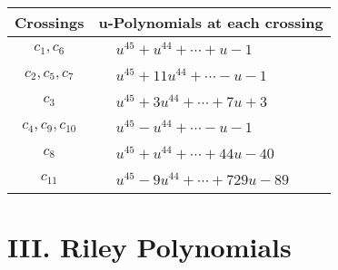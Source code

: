 \documentclass[1p]{elsarticle_modified}
\theoremstyle{definition}
\begin{document}
\begin{tabular}{m{50pt}|m{274pt}}
Crossings & \hspace{64pt}u-Polynomials at each crossing \\
\hline $$\begin{aligned}c_{1},c_{6}\end{aligned}$$&$\begin{aligned}
&u^{45}+u^{44}+\cdots+u-1
\end{aligned}$\\
\hline $$\begin{aligned}c_{2},c_{5},c_{7}\end{aligned}$$&$\begin{aligned}
&u^{45}+11 u^{44}+\cdots- u-1
\end{aligned}$\\
\hline $$\begin{aligned}c_{3}\end{aligned}$$&$\begin{aligned}
&u^{45}+3 u^{44}+\cdots+7 u+3
\end{aligned}$\\
\hline $$\begin{aligned}c_{4},c_{9},c_{10}\end{aligned}$$&$\begin{aligned}
&u^{45}- u^{44}+\cdots- u-1
\end{aligned}$\\
\hline $$\begin{aligned}c_{8}\end{aligned}$$&$\begin{aligned}
&u^{45}+u^{44}+\cdots+44 u-40
\end{aligned}$\\
\hline $$\begin{aligned}c_{11}\end{aligned}$$&$\begin{aligned}
&u^{45}-9 u^{44}+\cdots+729 u-89
\end{aligned}$\\
\hline
\end{tabular}\newpage\renewcommand{\arraystretch}{1}
\centering \section*{ III. Riley Polynomials}
\end{document}
